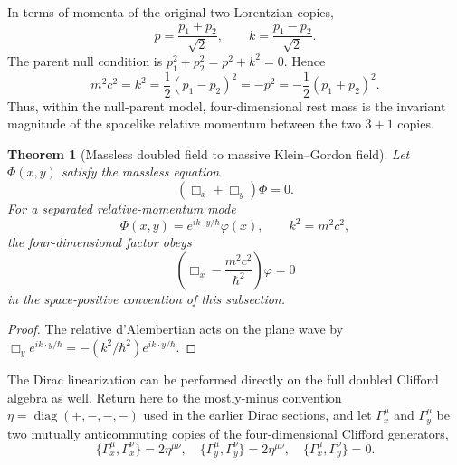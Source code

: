 \documentclass[11pt]{article}
\newtheorem{theorem}{Theorem}[section]
\theoremstyle{definition}\newtheorem{definition}[theorem]{Definition}
\theoremstyle{remark}\newtheorem{remark}[theorem]{Remark}\newtheorem{conjecture}[theorem]{Conjecture}
\begin{document}
In terms of momenta of the original two Lorentzian copies,
\begin{equation}
 p=\frac{p_1+p_2}{\sqrt2},\qquad
 k=\frac{p_1-p_2}{\sqrt2}.
\end{equation}
The parent null condition is $p_1^2+p_2^2=p^2+k^2=0$. Hence
\begin{equation}\label{eq:relmass}
 \boxed{
 m^2c^2=k^2
 =\frac12(p_1-p_2)^2
 =-p^2
 =-\frac12(p_1+p_2)^2.}
\end{equation}
Thus, within the null-parent model, four-dimensional rest mass is the invariant magnitude of the spacelike relative momentum between the two $3+1$ copies.

\begin{theorem}[Massless doubled field to massive Klein--Gordon field]\label{thm:kgnullparent}
Let $\Phi(x,y)$ satisfy the massless equation
\begin{equation}
 (\Box_x+\Box_y)\Phi=0.
\end{equation}
For a separated relative-momentum mode
\begin{equation}
 \Phi(x,y)=e^{ik\cdot y/\hbar}\varphi(x),\qquad k^2=m^2c^2,
\end{equation}
the four-dimensional factor obeys
\begin{equation}
 \boxed{\left(\Box_x-\frac{m^2c^2}{\hbar^2}\right)\varphi=0}
\end{equation}
in the space-positive convention of this subsection.
\end{theorem}
\begin{proof}
The relative d'Alembertian acts on the plane wave by $\Box_y e^{ik\cdot y/\hbar}=-(k^2/\hbar^2)e^{ik\cdot y/\hbar}$.
\end{proof}

The Dirac linearization can be performed directly on the full doubled Clifford algebra as well. Return here to the mostly-minus convention $\eta=\operatorname{diag}(+,-,-,-)$ used in the earlier Dirac sections, and let $\Gamma_x^\mu$ and $\Gamma_y^\mu$ be two mutually anticommuting copies of the four-dimensional Clifford generators,
\begin{equation}
 \{\Gamma_x^\mu,\Gamma_x^\nu\}=2\eta^{\mu\nu},\quad
 \{\Gamma_y^\mu,\Gamma_y^\nu\}=2\eta^{\mu\nu},\quad
 \{\Gamma_x^\mu,\Gamma_y^\nu\}=0.
\end{equation}
\end{document}
